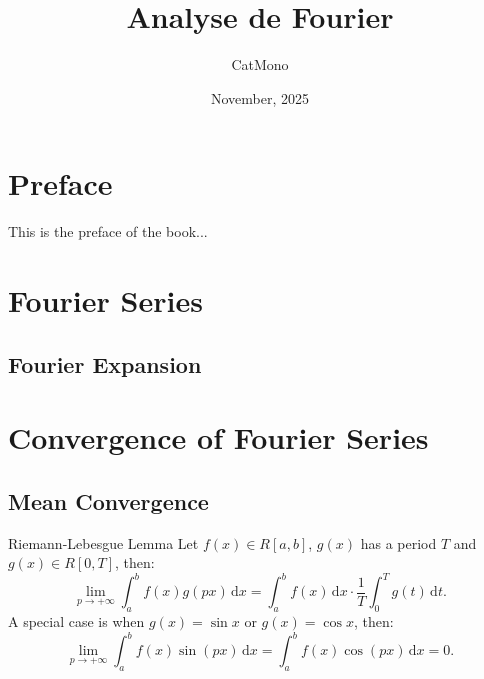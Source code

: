 \documentclass[11pt]{../../TexTemplate/elegantbook} %
\title{Analyse de Fourier} %
\author{CatMono} %
\date{November, 2025} %
\begin{document}
\maketitle %

\frontmatter        %
\tableofcontents    %

\chapter{Preface}   %
This is the preface of the book...

\mainmatter         %

\chapter{Fourier Series} %
\section{Fourier Expansion}



\chapter{Convergence of Fourier Series} %
\section{Mean Convergence} %

\begin{lemma}{Riemann-Lebesgue Lemma}
    Let \( f(x) \in R[a, b] \), \( g(x) \) has a period \( T \) and \( g(x) \in R[0, T] \),
    then:
    \[
    \lim_{p \to +\infty}\int_{a}^{b} f(x)g(px) \, \mathrm{d}x 
    = \int_{a}^{b} f(x) \, \mathrm{d}x \cdot \frac{1}{T} \int_{0}^{T} g(t) \, \mathrm{d}t.
    \]
    A special case is when \( g(x) = \sin x \) or \( g(x) = \cos x \), then:
    \[
    \lim_{p \to +\infty}\int_{a}^{b} f(x)\sin(px) \, \mathrm{d}x 
    = \int_{a}^{b} f(x)\cos(px) \, \mathrm{d}x = 0.
    \]
\end{lemma}
\end{document}
